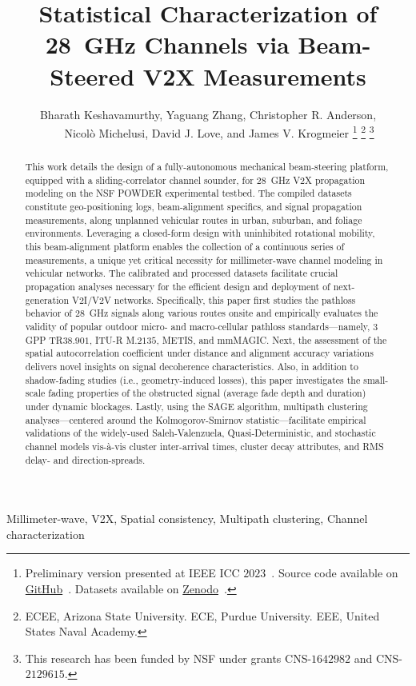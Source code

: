 \documentclass[12pt, draftcls, onecolumn]{IEEEtran}
\title{Statistical Characterization of \SI{28}{\giga\hertz} Channels via Beam-Steered V2X Measurements}
\author{Bharath Keshavamurthy\IEEEauthorrefmark{1}, Yaguang Zhang\IEEEauthorrefmark{2}, Christopher R. Anderson\IEEEauthorrefmark{3},\\\ \ \ \ Nicol\`{o} Michelusi\IEEEauthorrefmark{1}, David J. Love\IEEEauthorrefmark{2}, and James V. Krogmeier\IEEEauthorrefmark{2}
\thanks{Preliminary version presented at IEEE ICC $2023$~\cite{SPAVE_ICC}. Source code available on \href{https://github.com/bharathkeshavamurthy/SPAVE-28G}{GitHub}~\cite{SPAVE_Source_Code}. Datasets available on \href{https://doi.org/10.5281/zenodo.7178597}{Zenodo}~\cite{SPAVE_Dataset}.}
\thanks{\IEEEauthorrefmark{1}ECEE, Arizona State University. \IEEEauthorrefmark{2}ECE, Purdue University. \IEEEauthorrefmark{3}EEE, United States Naval Academy.}
\thanks{This research has been funded by NSF under grants CNS-$1642982$ and CNS-$2129615$.}
\vspace{-5mm}
}
\begin{document}

\maketitle
\thispagestyle{plain}
\pagestyle{plain}
\vspace{-5mm}

\begin{abstract}
This work details the design of a fully-autonomous mechanical beam-steering platform, equipped with a sliding-correlator channel sounder, for \SI{28}{\giga\hertz} V2X propagation modeling on the NSF POWDER experimental testbed. The compiled datasets constitute geo-positioning logs, beam-alignment specifics, and signal propagation measurements, along unplanned vehicular routes in urban, suburban, and foliage environments. Leveraging a closed-form design with uninhibited rotational mobility, this beam-alignment platform enables the collection of a continuous series of measurements, a unique yet critical necessity for millimeter-wave channel modeling in vehicular networks. The calibrated and processed datasets facilitate crucial propagation analyses necessary for the efficient design and deployment of next-generation V$2$I/V$2$V networks. Specifically, this paper first studies the pathloss behavior of \SI{28}{\giga\hertz} signals along various routes onsite and empirically evaluates the validity of popular outdoor micro- and macro-cellular pathloss standards---namely, $3$GPP TR$38.901$, ITU-R M$.2135$, METIS, and mmMAGIC. Next, the assessment of the spatial autocorrelation coefficient under distance and alignment accuracy variations delivers novel insights on signal decoherence characteristics. Also, in addition to shadow-fading studies (i.e., geometry-induced losses), this paper investigates the small-scale fading properties of the obstructed signal (average fade depth and duration) under dynamic blockages. Lastly, using the SAGE algorithm, multipath clustering analyses---centered around the Kolmogorov-Smirnov statistic---facilitate empirical validations of the widely-used Saleh-Valenzuela, Quasi-Deterministic, and stochastic channel models vis-\`{a}-vis cluster inter-arrival times, cluster decay attributes, and RMS delay- and direction-spreads.
\end{abstract}

\begin{IEEEkeywords}
    \begin{center}
        Millimeter-wave, V2X, Spatial consistency, Multipath clustering, Channel characterization
    \end{center}
\end{IEEEkeywords}
\clearpage
\end{document}
